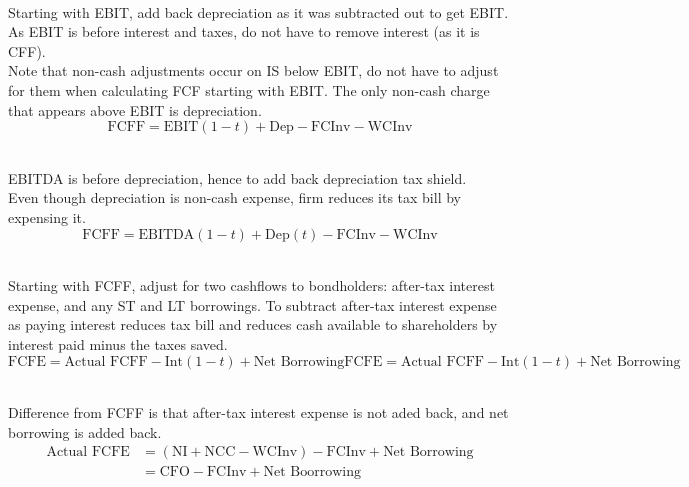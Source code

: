 \begin{method} \\
Starting with EBIT, add back depreciation as it was subtracted out to get EBIT.\\
As EBIT is before interest and taxes, do not have to remove interest (as it is CFF).\\
Note that non-cash adjustments occur on IS below EBIT, do not have to adjust for them when calculating FCF starting with EBIT. The only non-cash charge that appears above EBIT is depreciation.
\begin{equation}
\text{FCFF} = \text{EBIT}(1-t) + \text{Dep} - \text{FCInv} - \text{WCInv} \nonumber
\end{equation}
\end{method}

\begin{method} \\
EBITDA is before depreciation, hence to add back depreciation tax shield.\\
Even though depreciation is non-cash expense, firm reduces its tax bill by expensing it.
\begin{equation}
\text{FCFF} = \text{EBITDA}(1-t) + \text{Dep}(t) - \text{FCInv} - \text{WCInv} \nonumber
\end{equation}
\end{method}

\begin{method} \\
Starting with FCFF, adjust for two cashflows to bondholders: after-tax interest expense, and any ST and LT borrowings. To subtract after-tax interest expense as paying interest reduces tax bill and reduces cash available to shareholders by interest paid minus the taxes saved.
\begin{equation}
\text{FCFE} = \text{Actual FCFF} - \text{Int}(1-t) + \text{Net Borrowing} \nonumber\text{FCFE} = \text{Actual FCFF} - \text{Int}(1-t) + \text{Net Borrowing} \nonumber
\end{equation}
\end{method}

\begin{method} \\
Difference from FCFF is that after-tax interest expense is not aded back, and net borrowing is added back.
\begin{align}
\text{Actual FCFE} &= (\text{NI} + \text{NCC} - \text{WCInv}) - \text{FCInv} + \text{Net Borrowing} \nonumber \\
&= \text{CFO} - \text{FCInv} + \text{Net Boorrowing} \nonumber
\end{align}
\end{method}

